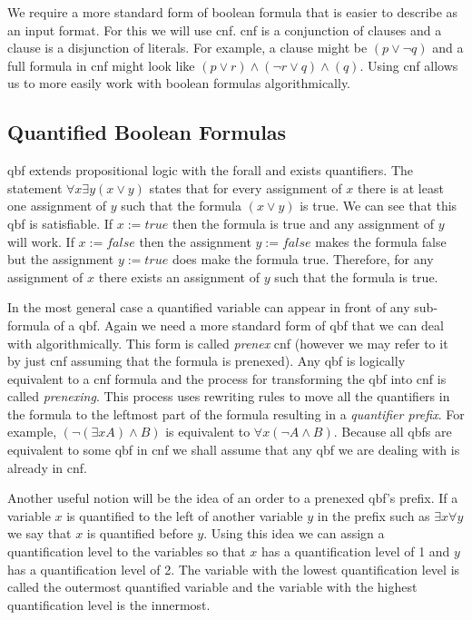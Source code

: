 We require a more standard form of boolean formula that is easier to describe as an input format. For this we will use \gls{cnf}. \Gls{cnf} is a conjunction of clauses and a clause is a disjunction of literals. For example, a clause might be $(p \lor \neg q)$ and a full formula in \gls{cnf} might look like $(p \lor r) \land (\neg r \lor q) \land (q)$. Using \gls{cnf} allows us to more easily work with boolean formulas algorithmically.

\subsection{Quantified Boolean Formulas} \label{qbf}
\Gls{qbf} extends propositional logic with the \gls{forall} and \gls{exists} quantifiers. The statement $\forall x \exists y (x \lor y)$ states that for every assignment of $x$ there is at least one assignment of $y$ such that the formula $(x \lor y)$ is true. We can see that this \gls{qbf} is satisfiable. If $x := true$ then the formula is true and any assignment of $y$ will work. If $x := false$ then the assignment $y := false$ makes the formula false but the assignment $y := true$ does make the formula true. Therefore, for any assignment of $x$ there exists an assignment of $y$ such that the formula is true.

In the most general case a quantified variable can appear in front of any sub-formula of a \gls{qbf}. Again we need a more standard form of \gls{qbf} that we can deal with algorithmically. This form is called \textit{prenex} \gls{cnf} (however we may refer to it by just \gls{cnf} assuming that the formula is prenexed). Any \gls{qbf} is logically equivalent to a \gls{cnf} formula and the process for transforming the \gls{qbf} into \gls{cnf} is called \textit{prenexing}. This process uses rewriting rules to move all the quantifiers in the formula to the leftmost part of the formula resulting in a \textit{quantifier prefix}. For example, $(\neg (\exists x A) \land B)$ is equivalent to $\forall x (\neg A \land B)$. Because all \glspl{qbf} are equivalent to some \gls{qbf} in \gls{cnf} we shall assume that any \gls{qbf} we are dealing with is already in \gls{cnf}.

Another useful notion will be the idea of an order to a prenexed \gls{qbf}'s prefix. If a variable $x$ is quantified to the left of another variable $y$ in the prefix such as $\exists x \forall y$ we say that $x$ is quantified before $y$. Using this idea we can assign a quantification level to the variables so that $x$ has a quantification level of 1 and $y$ has a quantification level of 2. The variable with the lowest quantification level is called the outermost quantified variable and the variable with the highest quantification level is the innermost.

